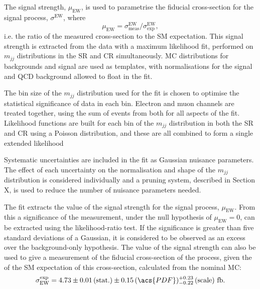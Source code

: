 
The signal strength, $\mu_\text{EW}$, is used to parametrise the fiducial
cross-section for the signal process, $\sigma^\text{EW}$, where
%
\begin{equation*}
  \mu_\text{EW} = \sigma^\text{EW}_\text{meas} / \sigma^\text{EW}_\text{exp},
\end{equation*}
%
i.e. the ratio of the measured cross-section to the \ac{SM} expectation. This
signal strength is extracted from the data with a maximum likelihood fit,
performed on $m_{jj}$ distributions in the \ac{SR} and \ac{CR} simultaneously.
\ac{MC} distributions for backgrounds and signal are used as templates, with
normalisations for the signal and \ac{QCD} \Zy background allowed to float in
the fit.

The bin size of the $m_{jj}$ distribution used for the fit is chosen to optimise
the statistical significance of data in each bin. Electron and muon channels are
treated together, using the sum of events from both for all aspects of the fit.
Likelihood functions are built for each bin of the $m_{jj}$ distribution in both
the \ac{SR} and \ac{CR} using a Poisson distribution, and these are all combined
to form a single extended likelihood

Systematic uncertainties are included in the fit as Gaussian nuisance
parameters. The effect of each uncertainty on the normalisation and shape of the
$m_{jj}$ distribution is considered individually and a pruning system, described
in Section X, %
is used to reduce the number of nuisance parameters needed.

The fit extracts the value of the signal strength for the signal process,
$\mu_\text{EW}$. From this a significance of the measurement, under the null
hypothesis of $\mu_\text{EW}=0$, can be extracted using the likelihood-ratio
test. If the significance is greater than five standard deviations of a
Gaussian, it is considered to be observed as an excess over the background-only
hypothesis. The value of the signal strength can also be used to give a
measurement of the fiducial cross-section of the process, given the of the
\ac{SM} expectation of this cross-section, calculated from the nominal \ac{MC}:
%
\begin{equation*}
  \sigma_\text{EW}^\text{exp} = 4.73
  \pm 0.01 \, (\text{stat.})
  \pm 0.15 \, (\acs{PDF})
  ^{+0.23} _{-0.22} \, (\text{scale})
  ~\text{fb}.
\end{equation*}

